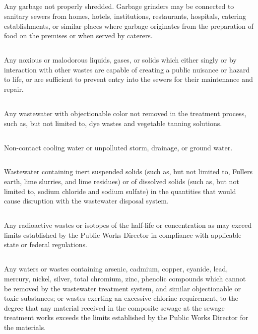 \subsection{}
Any garbage not properly shredded.  Garbage grinders may be connected to sanitary sewers from homes, hotels, institutions, restaurants, hospitals, catering establishments, or similar places where garbage originates from the preparation of food on the premises or when served by caterers.
\subsection{}
Any noxious or malodorous liquids, gases, or solids which either singly or by interaction with other wastes are capable of creating a public nuisance or hazard to life, or are sufficient to prevent entry into the sewers for their maintenance and repair.
\subsection{}
Any wastewater with objectionable color not removed in the treatment process, such as, but not limited to, dye wastes and vegetable tanning solutions.
\subsection{}
Non-contact cooling water or unpolluted storm, drainage, or ground water.
\subsection{}
Wastewater containing inert suspended solids (such as, but not limited to, Fullers earth, lime slurries, and lime residues) or of dissolved solids (such as, but not limited to, sodium chloride and sodium sulfate) in the quantities that would cause disruption with the wastewater disposal system.
\subsection{}
Any radioactive wastes or isotopes of the half-life or concentration as may exceed limits established by the Public Works Director in compliance with applicable state or federal regulations.
\subsection{}
Any waters or wastes containing arsenic, cadmium, copper, cyanide, lead, mercury, nickel, silver, total chromium, zinc, phenolic compounds which cannot be removed by the wastewater treatment system, and similar objectionable or toxic substances; or wastes exerting an excessive chlorine requirement, to the degree that any material received in the composite sewage at the sewage treatment works exceeds the limits established by the Public Works Director for the materials.
